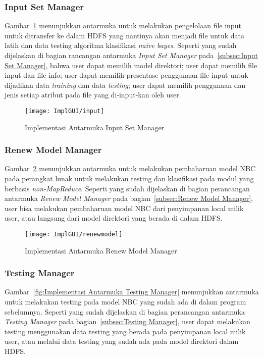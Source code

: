 \subsubsection{Input Set Manager}
Gambar~\ref{fig:Implementasi Antarmuka Input Set Manager} menunjukkan antarmuka untuk melakukan pengelolaan file input untuk ditransfer ke dalam HDFS yang nantinya akan menjadi file untuk data latih dan data testing algoritma klasifikasi \textit{naive bayes}. Seperti yang sudah dijelaskan di bagian rancangan antarmuka \textit{Input Set Manager} pada~\ref{subsec:Input Set Manager}, bahwa user dapat memilih model direktori; user dapat memilih file input dan file info; user dapat memilih presentase penggunaan file input untuk dijadikan data \textit{training} dan data \textit{testing}; user dapat memilih penggunaan dan jenis setiap atribut pada file yang di-input-kan oleh user.

\begin{figure}[H]
	\centering
	\texttt{[image: ImplGUI/input]}
	\caption[Implementasi Antarmuka Input Set Manager]{Implementasi Antarmuka Input Set Manager}
	\label{fig:Implementasi Antarmuka Input Set Manager}
\end{figure}


\subsubsection{Renew Model Manager}
Gambar~\ref{fig:Implementasi Antarmuka Renew Model Manager} menunjukkan antarmuka untuk melakukan pembaharuan model NBC pada perangkat lunak untuk melakukan testing dan klasifikasi pada modul yang berbasis \textit{non-MapReduce}. Seperti yang sudah dijelaskan di bagian perancangan antarmuka \textit{Renew Model Manager} pada bagian~\ref{subsec:Renew Model Manager}, user bisa melakukan pembaharuan model NBC dari penyimpanan local milik user, atau langsung dari model direktori yang berada di dalam HDFS.

\begin{figure}[H]
	\centering
	\texttt{[image: ImplGUI/renewmodel]}
	\caption[Implementasi Antarmuka Renew Model Manager]{Implementasi Antarmuka Renew Model Manager}
	\label{fig:Implementasi Antarmuka Renew Model Manager}
\end{figure}


\subsubsection{Testing Manager}
Gambar~\ref{fig:Implementasi Antarmuka Testing Manager} menunjukkan antarmuka untuk melakukan testing pada model NBC yang sudah ada di dalam program sebelumnya. Seperti yang sudah dijelaskan di bagian perancangan antarmuka \textit{Testing Manager} pada bagian~\ref{subsec:Testing Manager}, user dapat melakukan testing menggunakan data testing yang berada pada penyimpanan local milik user, atau melalui data testing yang sudah ada pada model direktori dalam HDFS.

